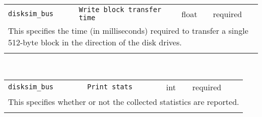 \noindent 
\begin{tabular}{|p{\lpmodwidth}|p{\lpnamewidth}|p{0.5in}|p{0.5in}|}
\cline{1-4}
\texttt{disksim\_bus} & \texttt{Write block transfer time} & float & required \\ 
\cline{1-4}
\multicolumn{4}{|p{6in}|}{
This specifies the time (in milliseconds) required to transfer a single
512-byte block in the direction of the disk drives.
}\\ 
\cline{1-4}
\multicolumn{4}{p{5in}}{}\\
\end{tabular}\\ 
\noindent 
\begin{tabular}{|p{\lpmodwidth}|p{\lpnamewidth}|p{0.5in}|p{0.5in}|}
\cline{1-4}
\texttt{disksim\_bus} & \texttt{Print stats} & int & required \\ 
\cline{1-4}
\multicolumn{4}{|p{6in}|}{
This specifies whether or not the collected statistics are reported.
}\\ 
\cline{1-4}
\multicolumn{4}{p{5in}}{}\\
\end{tabular}\\ 
